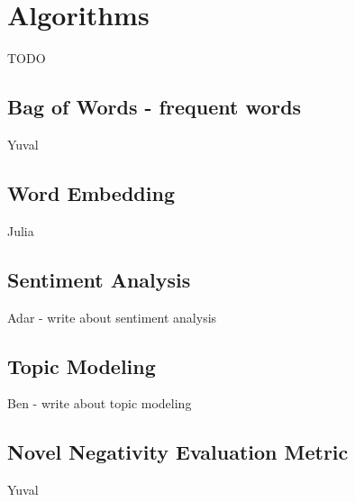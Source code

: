 \section{Algorithms}
TODO


\subsection{Bag of Words - frequent words}
Yuval

\subsection{Word Embedding}
Julia

\subsection{Sentiment Analysis}
Adar - write about sentiment analysis

\subsection{Topic Modeling}
Ben - write about topic modeling

\subsection{Novel Negativity Evaluation Metric}
Yuval